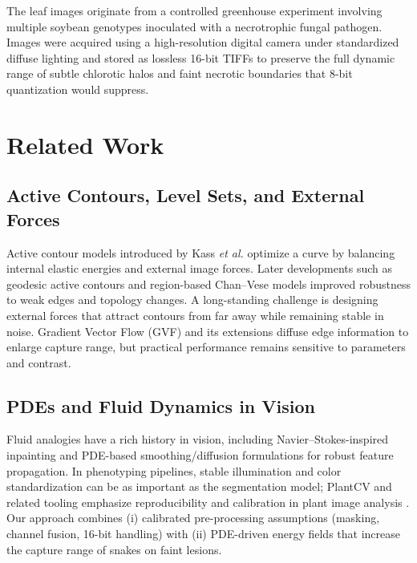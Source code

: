 \documentclass[11pt,a4paper]{article}
\begin{document}
The leaf images originate from a controlled greenhouse experiment involving multiple soybean genotypes inoculated with a necrotrophic fungal pathogen. Images were acquired using a high-resolution digital camera under standardized diffuse lighting and stored as lossless 16-bit TIFFs to preserve the full dynamic range of subtle chlorotic halos and faint necrotic boundaries that 8-bit quantization would suppress.

\section{Related Work}

\subsection{Active Contours, Level Sets, and External Forces}
Active contour models introduced by Kass \emph{et al.} \citep{kass1988snakes} optimize a curve by balancing internal elastic energies and external image forces. Later developments such as geodesic active contours \citep{caselles1997geodesic} and region-based Chan--Vese models \citep{chan2001active} improved robustness to weak edges and topology changes. A long-standing challenge is designing external forces that attract contours from far away while remaining stable in noise. Gradient Vector Flow (GVF) \citep{xu1998gvf} and its extensions diffuse edge information to enlarge capture range, but practical performance remains sensitive to parameters and contrast.

\subsection{PDEs and Fluid Dynamics in Vision}
Fluid analogies have a rich history in vision, including Navier--Stokes-inspired inpainting \citep{bertalmio2000navier} and PDE-based smoothing/diffusion formulations for robust feature propagation. In phenotyping pipelines, stable illumination and color standardization can be as important as the segmentation model; PlantCV and related tooling emphasize reproducibility and calibration in plant image analysis \citep{berry2018color,plantcv2025}. Our approach combines (i) calibrated pre-processing assumptions (masking, channel fusion, 16-bit handling) with (ii) PDE-driven energy fields that increase the capture range of snakes on faint lesions.
\end{document}
